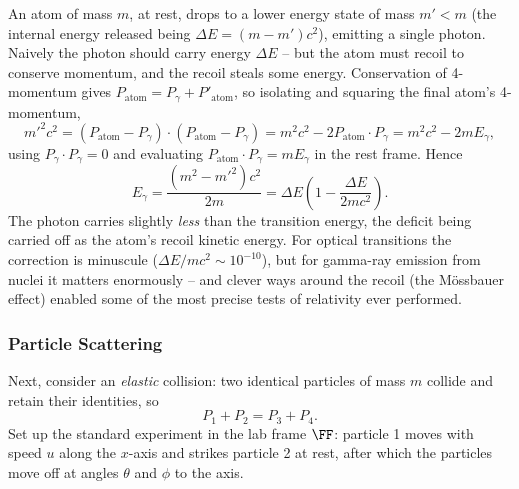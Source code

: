 \begin{example}
	An atom of mass $m$, at rest, drops to a lower energy state of mass $m' < m$ (the internal energy released being $\Delta E = (m - m')c^2$), emitting a single photon. Naively the photon should carry energy $\Delta E$ -- but the atom must recoil to conserve momentum, and the recoil steals some energy. Conservation of 4-momentum gives $P_{\text{atom}} = P_\gamma + P'_{\text{atom}}$, so isolating and squaring the final atom's 4-momentum,
	$$
	m'^2 c^2 = (P_{\text{atom}} - P_\gamma)\cdot(P_{\text{atom}} - P_\gamma) = m^2c^2 - 2 P_{\text{atom}} \cdot P_\gamma = m^2 c^2 - 2m E_\gamma,
	$$
	using $P_\gamma \cdot P_\gamma = 0$ and evaluating $P_{\text{atom}}\cdot P_\gamma = mE_\gamma$ in the rest frame. Hence
	$$
	E_\gamma = \frac{(m^2 - m'^2)c^2}{2m} = \Delta E \left(1 - \frac{\Delta E}{2mc^2}\right).
	$$
	The photon carries slightly \emph{less} than the transition energy, the deficit being carried off as the atom's recoil kinetic energy. For optical transitions the correction is minuscule ($\Delta E/mc^2 \sim 10^{-10}$), but for gamma-ray emission from nuclei it matters enormously -- and clever ways around the recoil (the M\"ossbauer effect) enabled some of the most precise tests of relativity ever performed.
\end{example}

\subsubsection{Particle Scattering}

Next, consider an \emph{elastic} collision: two identical particles of mass $m$ collide and retain their identities, so
$$
P_1 + P_2 = P_3 + P_4.
$$
Set up the standard experiment in the lab frame $\FF$: particle 1 moves with speed $u$ along the $x$-axis and strikes particle 2 at rest, after which the particles move off at angles $\theta$ and $\phi$ to the axis.

